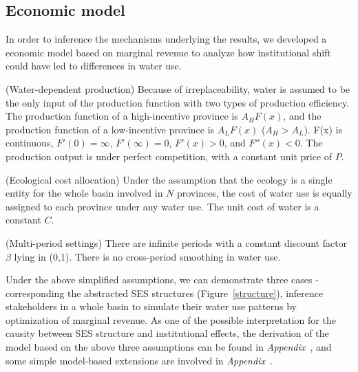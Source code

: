\subsection{Economic model}\label{sec:model}
In order to inference the mechanisms underlying the results, we developed a economic model based on marginal revenue to analyze how institutional shift could have led to differences in water use.

\begin{ass}
    (Water-dependent production) Because of irreplaceability, water is assumed to be the only input of the production function with two types of production efficiency. The production function of a high-incentive province is $A_HF(x)$, and the production function of a low-incentive province is $A_LF(x)$ ($A_H>A_L$). F(x) is continuous, $F'(0)=\infty$, $ F'(\infty)=0$, $F'(x)>0$, and $F''(x)<0$. The production output is under perfect competition, with a constant unit price of $P$.
\end{ass}

\begin{ass}
    (Ecological cost allocation) Under the assumption that the ecology is a single entity for the whole basin involved in $N$ provinces, the cost of water use is equally assigned to each province under any water use. The unit cost of water is a constant $C$.
\end{ass}

\begin{ass}
    (Multi-period settings) There are infinite periods with a constant discount factor $\beta$ lying in (0,1). There is no cross-period smoothing in water use.
\end{ass}

Under the above simplified assumptions, we can demonstrate three cases -corresponding the abstracted SES structures (Figure~\ref{structure}), inference stakeholders in a whole basin to simulate their water use patterns by optimization of marginal revenue.
As one of the possible interpretation for the causity between SES structure and institutional effects, the derivation of the model based on the above three assumptions can be found in \textit{Appendix~}, and some simple model-based extensions are involved in \textit{Appendix~}.

